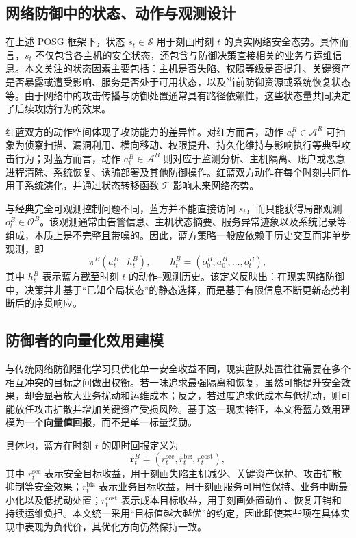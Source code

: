 \documentclass[12pt,a4paper]{article}
\begin{document}
\subsection{网络防御中的状态、动作与观测设计}

在上述 POSG 框架下，状态 $s_t\in\mathcal{S}$ 用于刻画时刻 $t$ 的真实网络安全态势。具体而言，$s_t$ 不仅包含各主机的安全状态，还包含与防御决策直接相关的业务与运维信息。本文关注的状态因素主要包括：主机是否失陷、权限等级是否提升、关键资产是否暴露或遭受影响、服务是否处于可用状态，以及当前防御资源或系统恢复状态等。由于网络中的攻击传播与防御处置通常具有路径依赖性，这些状态量共同决定了后续攻防行为的效果。

红蓝双方的动作空间体现了攻防能力的差异性。对红方而言，动作 $a_t^R\in\mathcal{A}^R$ 可抽象为侦察扫描、漏洞利用、横向移动、权限提升、持久化维持与影响执行等典型攻击行为；对蓝方而言，动作 $a_t^B\in\mathcal{A}^B$ 则对应于监测分析、主机隔离、账户或恶意进程清除、系统恢复、诱骗部署及其他防御操作。红蓝双方动作在每个时刻共同作用于系统演化，并通过状态转移函数 $\mathcal{T}$ 影响未来网络态势。

与经典完全可观测控制问题不同，蓝方并不能直接访问 $s_t$，而只能获得局部观测 $o_t^B\in\mathcal{O}^B$。该观测通常由告警信息、主机状态摘要、服务异常迹象以及系统记录等组成，本质上是不完整且带噪的。因此，蓝方策略一般应依赖于历史交互而非单步观测，即
\begin{equation}
\pi^B(a_t^B \mid h_t^B),
\qquad
h_t^B=(o_0^B,a_0^B,\dots,o_t^B),
\end{equation}
其中 $h_t^B$ 表示蓝方截至时刻 $t$ 的动作--观测历史。该定义反映出：在现实网络防御中，决策并非基于“已知全局状态”的静态选择，而是基于有限信息不断更新态势判断后的序贯响应。

\subsection{防御者的向量化效用建模}

与传统网络防御强化学习只优化单一安全收益不同，现实蓝队处置往往需要在多个相互冲突的目标之间做出权衡。若一味追求最强隔离和恢复，虽然可能提升安全效果，却会显著放大业务扰动和运维成本；反之，若过度追求低成本与低扰动，则可能放任攻击扩散并增加关键资产受损风险。基于这一现实特征，本文将蓝方效用建模为一个\textbf{向量值回报}，而不是单一标量奖励。

具体地，蓝方在时刻 $t$ 的即时回报定义为
\begin{equation}
\mathbf{r}_t^B
=
\left(
r_t^{\mathrm{sec}},
r_t^{\mathrm{biz}},
r_t^{\mathrm{cost}}
\right),
\end{equation}
其中 $r_t^{\mathrm{sec}}$ 表示安全目标收益，用于刻画失陷主机减少、关键资产保护、攻击扩散抑制等安全效果；$r_t^{\mathrm{biz}}$ 表示业务目标收益，用于刻画服务可用性保持、业务中断最小化以及低扰动处置；$r_t^{\mathrm{cost}}$ 表示成本目标收益，用于刻画处置动作、恢复开销和持续运维负担。本文统一采用“目标值越大越优”的约定，因此即使某些项在具体实现中表现为负代价，其优化方向仍然保持一致。
\end{document}
